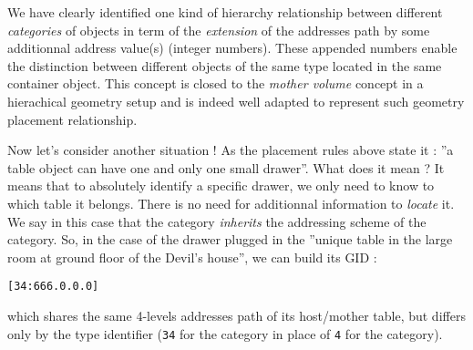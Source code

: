 \pn  We have  clearly identified  one kind  of  hierarchy relationship
between  different  \emph{categories}  of   objects  in  term  of  the
\emph{extension}  of the  addresses path  by some  additionnal address
value(s)  (integer   numbers).  These  appended   numbers  enable  the
distinction between different objects of  the same type located in the
same  container object.  This concept  is closed  to  the \emph{mother
  volume} concept in  a hierachical geometry setup and  is indeed well
adapted to represent such geometry placement relationship.

\pn  Now let's  consider another  situation !  As the  placement rules
above  state it  : ''a  table object  can have  one and  only  one small
drawer''. What  does it mean  ? It means  that to absolutely  identify a
specific  drawer, we  only need  to know  to which  table  it belongs.
There is no need for  additionnal information to \emph{locate} it.  We
say in this case  that the  category \emph{inherits}
the addressing scheme of the   category.  So, in the case of
the drawer plugged  in the ''unique table in the  large room at ground
floor of the Devil's house'', we can build its GID :
\begin{center}
\verb+[34:666.0.0.0]+ 
\end{center}
\pn which shares  the same 4-levels addresses path  of its host/mother
table,  but  differs only  by  the  type  identifier (\texttt{34}  for
the   category in place of \texttt{4} for the
 category).

